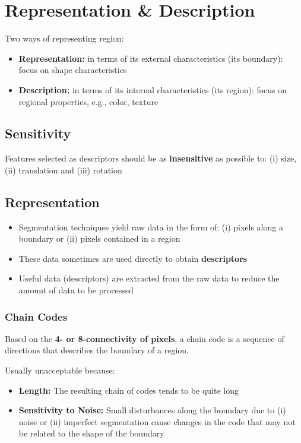 \section*{Representation \& Description}

Two ways of representing region:

\begin{itemize}
  \item \textbf{Representation:} in terms of its external
    characteristics (its boundary):
    focus on shape characteristics
  \item \textbf{Description:} in terms of its internal
    characteristics (its region): focus
    on regional properties, e.g., color, texture
\end{itemize}

\subsection*{Sensitivity}

Features selected as descriptors should be as \textbf{insensitive} as
possible to: (i) size, (ii) translation and (iii) rotation

\subsection*{Representation}

\begin{itemize}
  \item Segmentation techniques yield raw data in the form of:
    (i) pixels along a boundary or (ii) pixels contained in a region
  \item These data sometimes are used directly to obtain \textbf{descriptors}
  \item Useful data (descriptors) are extracted from the raw data
    to reduce the amount of data to be processed
\end{itemize}

\subsubsection*{Chain Codes}

Based on the \textbf{4- or 8-connectivity of pixels}, a chain code is a
sequence of directions that describes the boundary of a region.

Usually unacceptable because:

\begin{itemize}
  \item \textbf{Length:} The resulting chain of codes tends to be quite long
  \item \textbf{Sensitivity to Noise:} Small disturbances along the
    boundary due to (i) noise or (ii) imperfect segmentation cause
    changes in the code that may not be related to the shape of the boundary
\end{itemize}

